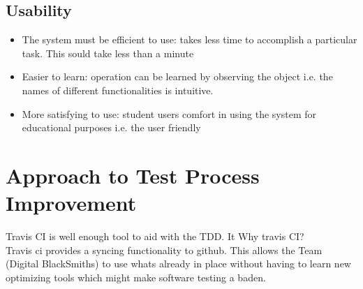 \documentclass[a4paper,12pt]{article}
\begin{document}
	\subsection{Usability}
		\begin{itemize}
		\item The system must be efficient to use: takes less time to accomplish a particular task. This sould take less than a minute
		\item Easier to learn: operation can be learned by observing the object i.e. the names of different functionalities is intuitive.
		\item More satisfying to use: student users comfort in using the system for educational purposes i.e. the user friendly
		\end{itemize}
		
\section{Approach to Test Process Improvement}
	
	Travis CI is well enough tool to aid with the TDD. It 
	Why travis CI? \\
	Travis ci provides a syncing functionality to github. 
  This allows the Team (Digital BlackSmiths) to use whats already in place without having to learn new optimizing tools which might make software testing a baden. 
\end{document}
